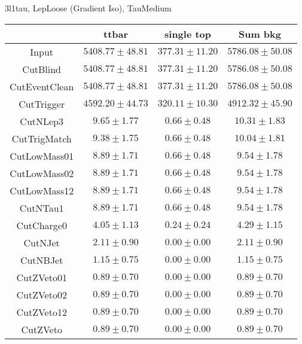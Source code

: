 \documentclass[11pt]{article}
\begin{document}
3l1tau, LepLoose (Gradient Iso), TauMedium \\
\begin{tabular}{|c|c|c|c|}
\hline
              & ttbar               & single top         & Sum bkg            \\
\hline
Input         & $5408.77 \pm 48.81$ & $377.31 \pm 11.20$ & $5786.08 \pm 50.08$\\
CutBlind      & $5408.77 \pm 48.81$ & $377.31 \pm 11.20$ & $5786.08 \pm 50.08$\\
CutEventClean & $5408.77 \pm 48.81$ & $377.31 \pm 11.20$ & $5786.08 \pm 50.08$\\
CutTrigger    & $4592.20 \pm 44.73$ & $320.11 \pm 10.30$ & $4912.32 \pm 45.90$\\
CutNLep3      &     $9.65 \pm 1.77$ &    $0.66 \pm 0.48$ &    $10.31 \pm 1.83$\\
CutTrigMatch  &     $9.38 \pm 1.75$ &    $0.66 \pm 0.48$ &    $10.04 \pm 1.81$\\
CutLowMass01  &     $8.89 \pm 1.71$ &    $0.66 \pm 0.48$ &     $9.54 \pm 1.78$\\
CutLowMass02  &     $8.89 \pm 1.71$ &    $0.66 \pm 0.48$ &     $9.54 \pm 1.78$\\
CutLowMass12  &     $8.89 \pm 1.71$ &    $0.66 \pm 0.48$ &     $9.54 \pm 1.78$\\
CutNTau1      &     $8.89 \pm 1.71$ &    $0.66 \pm 0.48$ &     $9.54 \pm 1.78$\\
CutCharge0    &     $4.05 \pm 1.13$ &    $0.24 \pm 0.24$ &     $4.29 \pm 1.15$\\
CutNJet       &     $2.11 \pm 0.90$ &    $0.00 \pm 0.00$ &     $2.11 \pm 0.90$\\
CutNBJet      &     $1.15 \pm 0.75$ &    $0.00 \pm 0.00$ &     $1.15 \pm 0.75$\\
CutZVeto01    &     $0.89 \pm 0.70$ &    $0.00 \pm 0.00$ &     $0.89 \pm 0.70$\\
CutZVeto02    &     $0.89 \pm 0.70$ &    $0.00 \pm 0.00$ &     $0.89 \pm 0.70$\\
CutZVeto12    &     $0.89 \pm 0.70$ &    $0.00 \pm 0.00$ &     $0.89 \pm 0.70$\\
CutZVeto      &     $0.89 \pm 0.70$ &    $0.00 \pm 0.00$ &     $0.89 \pm 0.70$\\
\hline
\end{tabular}
\end{document}
